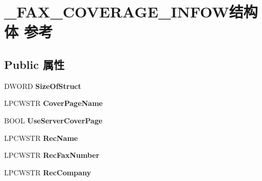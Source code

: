 \hypertarget{struct___f_a_x___c_o_v_e_r_a_g_e___i_n_f_o_w}{}\section{\+\_\+\+F\+A\+X\+\_\+\+C\+O\+V\+E\+R\+A\+G\+E\+\_\+\+I\+N\+F\+O\+W结构体 参考}
\label{struct___f_a_x___c_o_v_e_r_a_g_e___i_n_f_o_w}
\subsection*{Public 属性}
\begin{DoxyCompactItemize}
\item 
\mbox{\label{struct___f_a_x___c_o_v_e_r_a_g_e___i_n_f_o_w_a4d1437de3b7ae5577e34bdd3f8868e3e}} 
D\+W\+O\+RD {\bfseries Size\+Of\+Struct}
\item 
\mbox{\label{struct___f_a_x___c_o_v_e_r_a_g_e___i_n_f_o_w_a40da8028ba8ab6f7ed8e9ebb76a29f99}} 
L\+P\+C\+W\+S\+TR {\bfseries Cover\+Page\+Name}
\item 
\mbox{\label{struct___f_a_x___c_o_v_e_r_a_g_e___i_n_f_o_w_afd17a66c995597e4de55f867736a0d6e}} 
B\+O\+OL {\bfseries Use\+Server\+Cover\+Page}
\item 
\mbox{\label{struct___f_a_x___c_o_v_e_r_a_g_e___i_n_f_o_w_a2bfc5cd69b69559671efde23385a6782}} 
L\+P\+C\+W\+S\+TR {\bfseries Rec\+Name}
\item 
\mbox{\label{struct___f_a_x___c_o_v_e_r_a_g_e___i_n_f_o_w_a612e8e639eb12fc9efc4139177c8a4d7}} 
L\+P\+C\+W\+S\+TR {\bfseries Rec\+Fax\+Number}
\item 
\mbox{\label{struct___f_a_x___c_o_v_e_r_a_g_e___i_n_f_o_w_a1e38055cff20fc59bf3c4ae7418982b6}} 
L\+P\+C\+W\+S\+TR {\bfseries Rec\+Company}
\item 
\mbox{\label{struct___f_a_x___c_o_v_e_r_a_g_e___i_n_f_o_w_a55f4b2f7108620edaca3ceeb0766ba32}} 

\end{DoxyCompactItemize}
